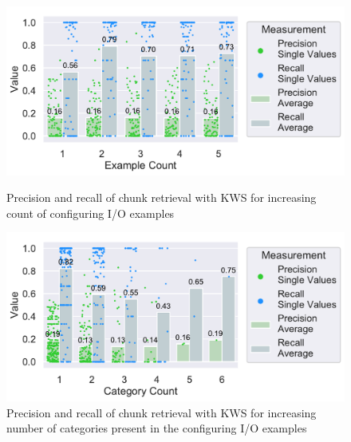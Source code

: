 \documentclass[\myrootdir/main.tex]{subfiles}
\begin{document}
\begin{figure}[htbp]
	\centering
	\begin{minipage}{0.45\textwidth}
		\centering
		\includegraphics[width=\textwidth, clip]{img/big-study/recall-precision-examplecount-KWS.pdf}
		\caption{Precision and recall of chunk retrieval with KWS for increasing count of configuring I/O examples}
		\label{fig:recall-precision-examplecount-KWS}
	\end{minipage}\hfill
	\begin{minipage}{0.45\textwidth}
		\centering
		\includegraphics[width=\textwidth, clip]{img/big-study/recall-precision-categorycount-KWS.pdf}
		\caption{Precision and recall of chunk retrieval with KWS for increasing number of categories present in the configuring I/O examples}
		\label{fig:recall-precision-categorycount-KWS}
	\end{minipage}
\end{figure}
\end{document}
